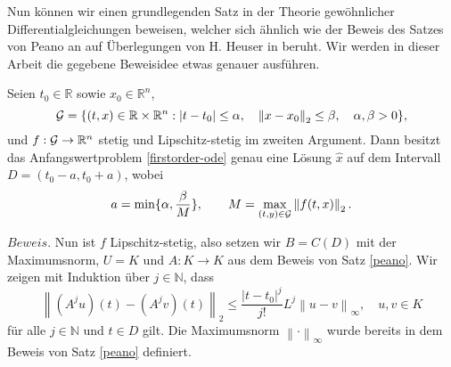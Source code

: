 Nun können wir einen grundlegenden Satz in der Theorie gewöhnlicher Differentialgleichungen beweisen, welcher sich
ähnlich wie der Beweis des Satzes von Peano an auf Überlegungen von H. Heuser in
\cite{harroheuserGewohnlicheDifferentialgleichungen} beruht. Wir werden in dieser Arbeit die gegebene Beweisidee etwas
genauer ausführen.
\begin{satz}
\label{picard}
    Seien $t_0 \in \mathbb{R}$ sowie $x_0 \in \mathbb{R}^n$,
    \[
        {\cal G}=\{(t,x) \in \mathbb{R} \times \mathbb{R}^{n}: |t-t_{0}| \leq \alpha, \quad
        \left\lVert x-x_{0} \right\rVert_2 \leq\beta, \quad \alpha,\beta > 0 \},
    \]
    und $f:{\cal G} \rightarrow \mathbb{R}^{n}$ stetig und Lipschitz-stetig im zweiten Argument.
    Dann besitzt das Anfangswertproblem \eqref{firstorder-ode} genau eine Lösung $\hat{x}$ auf dem Intervall
    $D=(t_{0}-a,t_{0}+a)$, wobei
    \[
        a=\min\{\alpha, \frac{\beta}{M}\}, \qquad M= \max_{(t,y)\in {\cal G}}\left\lVert f(t,x)\right\rVert_2 .
    \]
\end{satz}
$Beweis.$ Nun ist $f$ Lipschitz-stetig, also setzen wir $B=C(D)$ mit der Maximumsnorm, $U=K$ und $A:K \rightarrow K$
aus dem Beweis von Satz \ref{peano}. Wir zeigen mit Induktion über $j\in \mathbb{N}$, dass
\[
    \left\lVert (A^j u)(t) - (A^j v)(t) \right\rVert_2 \leq \frac{|t-t_0|^j}{j!} L^j\left\lVert u - v \right\rVert_{\infty},
    \quad u,v \in K
\]
für alle $j \in \mathbb{N}$ und $t \in D$ gilt. Die Maximumsnorm $\left\lVert \cdot \right\rVert_{\infty}$ wurde
bereits in dem Beweis von Satz \ref{peano} definiert.
